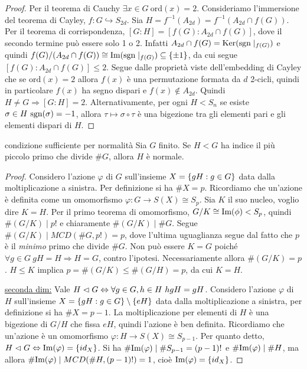 \begin{proof}
    Per il teorema di Cauchy $\exists x \in G \ \text{ord}(x) = 2$. Consideriamo l'immersione del teorema di Cayley, $f: G \hookrightarrow S_{2d}$. Sia $H = f^{-1}(A_{2d}) = f^{-1}(A_{2d} \cap f(G))$. Per il teorema di corrispondenza, $[G : H] = [f(G) : A_{2d} \cap f(G)]$, dove il secondo termine può essere solo 1 o 2. Infatti $A_{2d} \cap f(G) = \text{Ker}(\text{sgn}\mid_{f(G)})$ e quindi $f(G)/(A_{2d} \cap f(G)) \cong \text{Im}(\text{sgn}\mid_{f(G)}) \subseteq\{\pm 1\}$, da cui segue $[f(G) : A_{2d} \cap f(G)] \leq 2$.
    Segue dalle proprietà viste dell'embedding di Cayley che se $\text{ord}(x) = 2$ allora $f(x)$ è una permutazione formata da $d$ 2-cicli, quindi in particolare $f(x)$ ha segno dispari e $f(x) \not \in A_{2d}$. Quindi $H \neq G \Rightarrow [G:H] = 2$.
    Alternativamente, per ogni $H < S_n$ se esiste $\sigma \in H \ \text{sgn}(\sigma) = -1$, allora $\tau \mapsto \sigma \circ \tau$ è una bigezione tra gli elementi pari e gli elementi dispari di $H$.
\end{proof}
\begin{proposition}{condizione sufficiente per normalità}
    Sia $G$ finito. Se $H < G$ ha indice il più piccolo primo che divide $\#G$, allora $H$ è normale.
\end{proposition}
\begin{proof}
    Considero l'azione $\varphi$ di $G$ sull'insieme $X = \left\{ gH : g \in G \right\}$ data dalla moltiplicazione a sinistra. Per definizione si ha $\# X = p $. Ricordiamo che un'azione è definita come un omomorfismo $\varphi: G \rightarrow S(X) \cong S_p$. Sia $K$ il suo nucleo, voglio dire $K = H$. Per il primo teorema di omomorfismo, $G/K \cong \text{Im}(\phi) < S_p$, quindi $\#(G/K) \mid p!$ e chiaramente $\#(G/K) \mid \#G$. Segue $\#(G/K) \mid MCD(\# G, p!) = p$, dove l'ultima uguaglianza segue dal fatto che $p$ è il \textit{minimo} primo che divide $\#G$. Non può essere $K = G$ poiché $\forall g \in G \ gH = H \Rightarrow H = G$, contro l'ipotesi. Necessariamente allora $\#(G/K) = p$. $H \leq K$ implica $p = \#(G/K) \leq \#(G/H) = p$, da cui $K = H$.

    \underline{seconda dim:}
    Vale $H \vartriangleleft G \Leftrightarrow \forall g \in G, h \in H \ hgH = gH$. Considero l'azione $\varphi$ di $H$ sull'insieme $X = \left\{ gH : g \in G \right\} \setminus \{ eH \}$ data dalla moltiplicazione a sinistra, per definizione si ha $\# X = p - 1$.
    La moltiplicazione per elementi di $H$ è una bigezione di $G/H$ che fissa $eH$, quindi l'azione è ben definita. Ricordiamo che un'azione è un omomorfismo $\varphi: H \rightarrow S(X) \cong S_{p-1}$. Per quanto detto, $H \vartriangleleft G \Leftrightarrow \text{Im}(\varphi) = \{ id_X \}$. Si ha $\# \text{Im}(\varphi) \mid \#S_{p-1} = (p-1)!$ e $\# \text{Im}(\varphi) \mid \# H$, ma allora $\#\text{Im}(\varphi) \mid MCD(\#H, (p-1)!) = 1$, cioè $\text{Im}(\varphi) = \{id_X\}$.
\end{proof}

